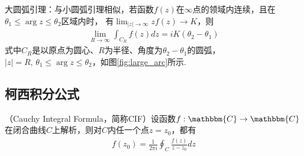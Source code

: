         \begin{lemma}
            \label{lem:large_arc_lemma}
            大圆弧引理：与小圆弧引理相似，若函数$f(z)$在$\infty$点的领域内连续，且在$\theta_1 \leq \arg{z} \leq \theta_2$区域内时，
            有$\lim_{|z| \to \infty}zf(z) \to K$，则
            \begin{align*}
                \lim_{R \to \infty}\int_{C_R}f(z)dz = iK(\theta_2 - \theta_1)
            \end{align*}
            式中$C_R$是以原点为圆心、$R$为半径、角度为$\theta_2 - \theta_1$的圆弧，
            $|z| = R,\,\theta_1 \leq \arg{z} \leq \theta_2$，如图\ref{fig:large_arc}所示.
        \end{lemma}

    \subsection{柯西积分公式}
        \begin{theorem}[Cauchy积分公式]\label{thm:cauchy_integral_formula}
            （Cauchy Integral Formula，简称CIF）设函数$f:\mathbbm{C} \to \mathbbm{C}$
            在闭合曲线$C$上解析，则对$C$内任一个点$z = z_0$，都有
            \begin{align*}
                \label{eq:cauchy_integral_formula}
                f(z_0) = \frac{1}{2 \pi i}\oint_{C}\frac{f(z)}{z - z_0}dz
            \end{align*}
        \end{theorem}

